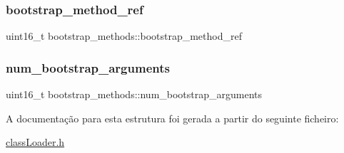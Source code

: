 \hypertarget{structbootstrap__methods_a33f37a176a86272b33b23a3d73d7c866}{}\label{structbootstrap__methods_a33f37a176a86272b33b23a3d73d7c866} 
\subsubsection{\texorpdfstring{bootstrap\+\_\+method\+\_\+ref}{bootstrap\_method\_ref}}
{\footnotesize\ttfamily uint16\+\_\+t bootstrap\+\_\+methods\+::bootstrap\+\_\+method\+\_\+ref}

\hypertarget{structbootstrap__methods_a72a791a335cd158d3a358df48ddec3af}{}\label{structbootstrap__methods_a72a791a335cd158d3a358df48ddec3af} 
\subsubsection{\texorpdfstring{num\+\_\+bootstrap\+\_\+arguments}{num\_bootstrap\_arguments}}
{\footnotesize\ttfamily uint16\+\_\+t bootstrap\+\_\+methods\+::num\+\_\+bootstrap\+\_\+arguments}



A documentação para esta estrutura foi gerada a partir do seguinte ficheiro\+:\begin{DoxyCompactItemize}
\item 
\hyperlink{class_loader_8h}{class\+Loader.\+h}\end{DoxyCompactItemize}
